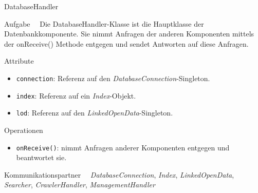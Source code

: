 \begin{class}{10}{DatabaseHandler}
\item[Aufgabe]~\
Die DatabaseHandler-Klasse ist die Hauptklasse der Datenbankkomponente. Sie nimmt Anfragen der anderen Komponenten mittels der onReceive() Methode entgegen und sendet Antworten auf diese Anfragen.
\item[Attribute]~\
\begin{itemize}
  \item \texttt{connection}: Referenz auf den \textit{DatabaseConnection}-Singleton.
  \item \texttt{index}: Referenz auf ein \textit{Index}-Objekt.
  \item \texttt{lod}: Referenz auf den \textit{LinkedOpenData}-Singleton.
\end{itemize}
\item[Operationen]~\
\begin{itemize}
  \item \texttt{onReceive()}: nimmt Anfragen anderer Komponenten entgegen und beantwortet sie.
\end{itemize}
\item[Kommunikationspartner]~\
  \textit{DatabaseConnection}, \textit{Index}, \textit{LinkedOpenData}, \textit{Searcher}, \textit{CrawlerHandler}, \textit{ManagementHandler}
\end{class}

